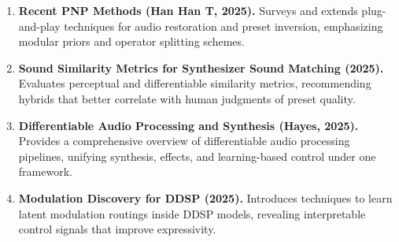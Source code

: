 \documentclass[12pt]{article}
\begin{document}
\begin{enumerate}[leftmargin=*]
    \item \textbf{Recent PNP Methods (Han Han T, 2025).} Surveys and extends plug-and-play techniques for audio restoration and preset inversion, emphasizing modular priors and operator splitting schemes.
    \item \textbf{Sound Similarity Metrics for Synthesizer Sound Matching (2025).} Evaluates perceptual and differentiable similarity metrics, recommending hybrids that better correlate with human judgments of preset quality.
    \item \textbf{Differentiable Audio Processing and Synthesis (Hayes, 2025).} Provides a comprehensive overview of differentiable audio processing pipelines, unifying synthesis, effects, and learning-based control under one framework.
    \item \textbf{Modulation Discovery for DDSP (2025).} Introduces techniques to learn latent modulation routings inside DDSP models, revealing interpretable control signals that improve expressivity.
\end{enumerate}

\cite{*}



\end{document}
